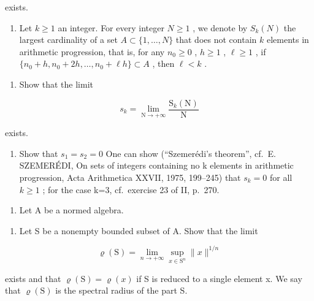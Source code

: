 exists.

\begin{enumerate}
\def\labelenumi{\arabic{enumi})}
\setcounter{enumi}{5}
\tightlist
\item
  Let \(k \geqslant 1\) an integer. For every integer \(N \geqslant 1\) , we denote by \(S_k(N)\) the largest cardinality of a set \(A \subset \{1, \ldots, N\}\) that does not contain \(k\) elements in arithmetic progression, that is, for any \(n_0 \geqslant 0\) , \(h \geqslant 1\) , \(\ell \geqslant 1\) , if \(\{n_0 + h, n_0 + 2h, \ldots, n_0 + \ell h\} \subset A\) , then \(\ell < k\) .
\end{enumerate}

\begin{enumerate}
\def\labelenumi{\alph{enumi})}
\tightlist
\item
  Show that the limit
\end{enumerate}

\[
s _ {k} = \lim _ {\mathrm{N} \to + \infty} \frac {\mathrm{S} _ {k} (\mathrm{N})}{\mathrm{N}}
\]

exists.

\begin{enumerate}
\def\labelenumi{\alph{enumi})}
\setcounter{enumi}{1}
\tightlist
\item
  Show that \(s_{1}=s_{2}=0\) One can show (“Szemerédi's theorem”, cf.~E. SZEMERÉDI, On sets of integers containing no k elements in arithmetic progression, Acta Arithmetica XXVII, 1975, 199--245) that \(s_{k}=0\) for all \(k\geqslant1\) ; for the case k=3, cf.~exercise 23 of II, p.~270.
\end{enumerate}

\begin{enumerate}
\def\labelenumi{\arabic{enumi})}
\setcounter{enumi}{6}
\tightlist
\item
  Let A be a normed algebra.
\end{enumerate}

\begin{enumerate}
\def\labelenumi{\alph{enumi})}
\tightlist
\item
  Let S be a nonempty bounded subset of A. Show that the limit
\end{enumerate}

\[
\varrho (\mathrm{S}) = \lim _ {n \to + \infty} \sup _ {x \in \mathrm{S} ^ {n}} \| x \| ^ {1 / n}
\]

exists and that \(\varrho(\mathrm{S}) = \varrho(x)\) if S is reduced to a single element x. We say that \(\varrho(\mathrm{S})\) is the spectral radius of the part S.

